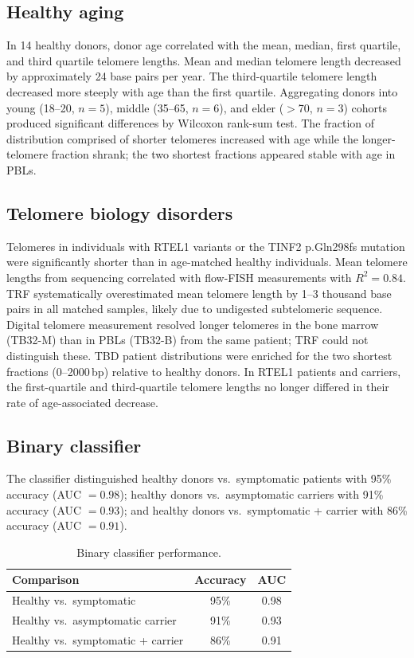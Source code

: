 \documentclass[11pt]{article}
\begin{document}
\subsection{Healthy aging}
In 14 healthy donors, donor age correlated with the mean, median, first quartile, and third quartile telomere lengths. Mean and median telomere length decreased by approximately 24 base pairs per year. The third-quartile telomere length decreased more steeply with age than the first quartile. Aggregating donors into young (18--20, $n=5$), middle (35--65, $n=6$), and elder ($>$70, $n=3$) cohorts produced significant differences by Wilcoxon rank-sum test. The fraction of distribution comprised of shorter telomeres increased with age while the longer-telomere fraction shrank; the two shortest fractions appeared stable with age in PBLs.

\subsection{Telomere biology disorders}
Telomeres in individuals with RTEL1 variants or the TINF2 p.Gln298fs mutation were significantly shorter than in age-matched healthy individuals. Mean telomere lengths from sequencing correlated with flow-FISH measurements with $R^2 = 0.84$. TRF systematically overestimated mean telomere length by 1--3 thousand base pairs in all matched samples, likely due to undigested subtelomeric sequence. Digital telomere measurement resolved longer telomeres in the bone marrow (TB32-M) than in PBLs (TB32-B) from the same patient; TRF could not distinguish these. TBD patient distributions were enriched for the two shortest fractions (0--2000\,bp) relative to healthy donors. In RTEL1 patients and carriers, the first-quartile and third-quartile telomere lengths no longer differed in their rate of age-associated decrease.

\subsection{Binary classifier}
The classifier distinguished healthy donors vs.\ symptomatic patients with 95\% accuracy (AUC $=0.98$); healthy donors vs.\ asymptomatic carriers with 91\% accuracy (AUC $=0.93$); and healthy donors vs.\ symptomatic + carrier with 86\% accuracy (AUC $=0.91$).

\begin{table}[h]
\centering
\caption{Binary classifier performance.}
\begin{tabular}{lcc}
\toprule
Comparison & Accuracy & AUC \\
\midrule
Healthy vs.\ symptomatic & 95\% & 0.98 \\
Healthy vs.\ asymptomatic carrier & 91\% & 0.93 \\
Healthy vs.\ symptomatic + carrier & 86\% & 0.91 \\
\bottomrule
\end{tabular}
\end{table}
\end{document}
